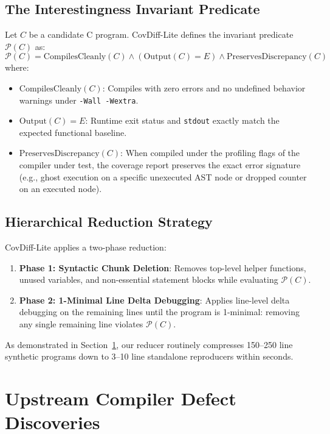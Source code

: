 \documentclass[sigconf,review,anonymous=false]{acmart}
\theoremstyle{definition}
\begin{document}
\subsection{The Interestingness Invariant Predicate}
Let $C$ be a candidate C program. CovDiff-Lite defines the invariant predicate $\mathcal{P}(C)$ as:
\begin{equation}
\mathcal{P}(C) = \text{CompilesCleanly}(C) \land (\text{Output}(C) = E) \land \text{PreservesDiscrepancy}(C)
\end{equation}
where:
\begin{itemize}
    \item $\text{CompilesCleanly}(C)$: Compiles with zero errors and no undefined behavior warnings under \texttt{-Wall -Wextra}.
    \item $\text{Output}(C) = E$: Runtime exit status and \texttt{stdout} exactly match the expected functional baseline.
    \item $\text{PreservesDiscrepancy}(C)$: When compiled under the profiling flags of the compiler under test, the coverage report preserves the exact error signature (e.g., ghost execution on a specific unexecuted AST node or dropped counter on an executed node).
\end{itemize}

\subsection{Hierarchical Reduction Strategy}
CovDiff-Lite applies a two-phase reduction:
\begin{enumerate}
    \item \textbf{Phase 1: Syntactic Chunk Deletion}: Removes top-level helper functions, unused variables, and non-essential statement blocks while evaluating $\mathcal{P}(C)$.
    \item \textbf{Phase 2: 1-Minimal Line Delta Debugging}: Applies line-level delta debugging on the remaining lines until the program is 1-minimal: removing any single remaining line violates $\mathcal{P}(C)$.
\end{enumerate}
As demonstrated in Section~\ref{sec:upstream_bugs}, our reducer routinely compresses 150--250 line synthetic programs down to 3--10 line standalone reproducers within seconds.

\section{Upstream Compiler Defect Discoveries}
\label{sec:upstream_bugs}
\end{document}
